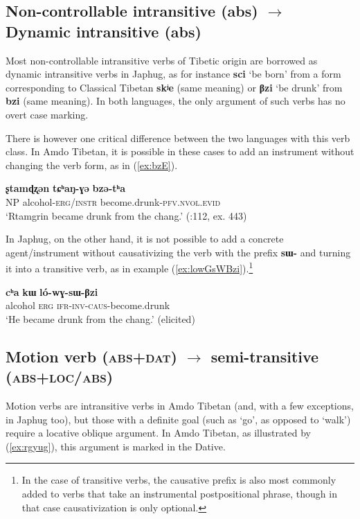 \documentclass[oneside,a4paper,11pt]{article}
\newcommand{\ipa}[1]{{\phon\textbf{\mbox{#1}}}} %
\newcommand{\refb}[1]{(\ref{#1})}
\begin{document}
\subsection{Non-controllable intransitive (abs) $\rightarrow$ Dynamic intransitive (abs)}  
Most non-controllable intransitive verbs of Tibetic origin are borrowed as dynamic intransitive verbs in Japhug, as for instance \ipa{sci} `be born' from a form corresponding to Classical Tibetan \ipa{skʲe} (same meaning) or \ipa{βzi} `be drunk' from \ipa{bzi} (same meaning). In both languages, the only argument of such verbs has no overt case marking.

There is however one critical difference between the two languages with this verb class. In Amdo Tibetan, it is possible in these cases to add an instrument without changing the verb form, as in \refb{ex:bzE}.

\begin{exe}
\ex \label{ex:bzE}
\gll
\ipa{ʂtamɖʐən} 	\ipa{tɕʰaŋ-ɣə} \ipa{bzə-tʰa} 	 \\
NP alcohol-\textsc{erg/instr} become.drunk-\textsc{pfv.nvol.evid} \\
\glt `Rtamgrin became drunk from the chang.' (\citealt{haller04themchen}:112, ex. 443)
\end{exe}

In Japhug, on the other hand, it is not possible to add a concrete agent/instrument without causativizing the verb with the prefix \ipa{sɯ-} and turning it into a transitive verb, as in example \refb{ex:lowGsWBzi}.\footnote{In the case of transitive verbs, the causative prefix is also most commonly added to verbs that take an instrumental postpositional phrase, though in that case causativization is only optional.}

\begin{exe}
\ex \label{ex:lowGsWBzi}
\gll
\ipa{cʰa} 	\ipa{kɯ} 	\ipa{ló-wɣ-sɯ-βzi} \\ 
alcohol \textsc{erg} \textsc{ifr-inv-caus}-become.drunk \\
\glt `He became drunk from the chang.' (elicited)
\end{exe}


\subsection{Motion verb (\textsc{abs+dat}) $\rightarrow$ semi-transitive (\textsc{abs+loc/abs})}  
Motion verbs are intransitive verbs in Amdo Tibetan (and, with a few exceptions, in Japhug too), but those with a definite goal (such as `go', as opposed to `walk') require a locative oblique argument. In Amdo Tibetan, as illustrated by \refb{ex:rgyug}, this argument is marked in the Dative.
\end{document}
